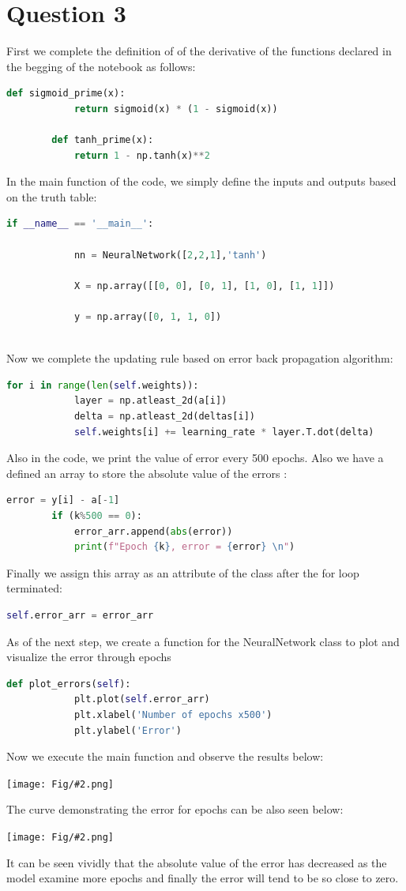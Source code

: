 \documentclass[]{article}
\newcommand{\pict}[2]{\begin{center}
		\texttt{[image: Fig/\#2.png]}
\end{center}}
\begin{document}
	\section{Question 3}
	First we complete the definition of of the derivative of the functions declared in the begging of the notebook as follows:
	\begin{lstlisting}[language=python]
		def sigmoid_prime(x):
			return sigmoid(x) * (1 - sigmoid(x))
			
		def tanh_prime(x):
			return 1 - np.tanh(x)**2
	\end{lstlisting}
	In the main function of the code, we simply define the inputs and outputs based on the truth table:
	\begin{lstlisting}[language=python]
		if __name__ == '__main__':
		
			nn = NeuralNetwork([2,2,1],'tanh')
			
			X = np.array([[0, 0], [0, 1], [1, 0], [1, 1]])
			
			y = np.array([0, 1, 1, 0])
			
	\end{lstlisting}
	Now we complete the updating rule based on error back propagation algorithm:
	\begin{lstlisting}[language=python]
		for i in range(len(self.weights)):
			layer = np.atleast_2d(a[i])
			delta = np.atleast_2d(deltas[i])
			self.weights[i] += learning_rate * layer.T.dot(delta)
	\end{lstlisting} 
	Also in the code, we print the value of error every 500 epochs. Also we have a defined an array to store the absolute value of the errors :
	\begin{lstlisting}[language=python]
		error = y[i] - a[-1]
		if (k%500 == 0):
			error_arr.append(abs(error))
			print(f"Epoch {k}, error = {error} \n")
	\end{lstlisting}
	Finally we assign this array as an attribute of the class after the for loop terminated:
	\begin{lstlisting}[language=python]
		self.error_arr = error_arr
	\end{lstlisting}
	As of the next step, we create a function for the NeuralNetwork class to plot and visualize the error through epochs
	\begin{lstlisting}[language=python]
		def plot_errors(self):
			plt.plot(self.error_arr)
			plt.xlabel('Number of epochs x500')
			plt.ylabel('Error')
	\end{lstlisting}
	Now we execute the main function and observe the results below:
	\pict{0.4}{F7}
	The curve demonstrating the error for epochs can be also seen below:
	\pict{0.5}{F8}
	It can be seen vividly that the absolute value of the error has decreased as the model examine more epochs and finally the error will tend to be so close to zero.
	
\end{document}
